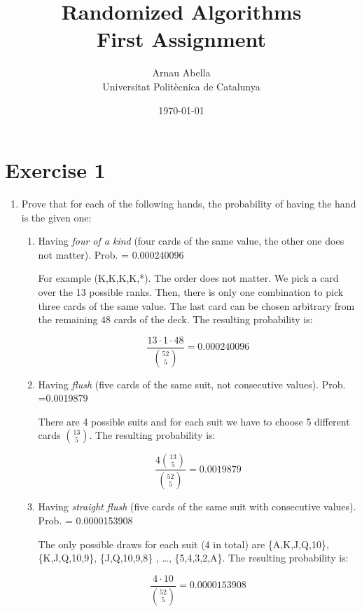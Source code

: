 \documentclass[12pt, a4paper]{article} %
\title{%
  Randomized Algorithms\\
  \large{First Assignment}
}
\author{%
  Arnau Abella \\
  \large{Universitat Polit\`ecnica de Catalunya}
}
\date{\today}
\begin{document}
\maketitle


\section*{Exercise 1}%
\label{sec:exercise_1}

\begin{enumerate}[label=( \alph*)]
  \item Prove that for each of the following hands, the probability of having the hand is the given one:
    \begin{enumerate}[label=\textbullet]
      \item Having \textit{four of a kind} (four cards of the same value, the other one does not matter). Prob. = 0.000240096

        For example (K,K,K,K,*). The order does not matter. We pick a card over the 13 possible ranks. Then, there is only one combination to pick three cards of the same value. The last card can be chosen arbitrary from the remaining 48 cards of the deck. The resulting probability is:

        \begin{equation}
          \frac{13 \cdot 1 \cdot 48}{\binom{52}{5}} = 0.000240096
        \end{equation}

      \item Having \textit{flush} (five cards of the same suit, not consecutive values). Prob. =0.0019879

        There are 4 possible suits and for each suit we have to choose 5 different cards $\binom{13}{5}$. The resulting probability is:

        \begin{equation}
          \frac{4 \binom{13}{5}}{\binom{52}{5}} = 0.0019879
        \end{equation}

      \item Having \textit{straight flush}  (five cards of the same suit with consecutive values). Prob. = 0.0000153908

        The only possible draws for each suit ($4$ in total) are \{A,K,J,Q,10\}, \{K,J,Q,10,9\}, \{J,Q,10,9,8\} , \ldots, \{5,4,3,2,A\}. The resulting probability is:

        \begin{equation}
          \frac{4 \cdot 10}{\binom{52}{5}} = 0.0000153908
        \end{equation}


\end{enumerate}
\end{enumerate}
\end{document}
